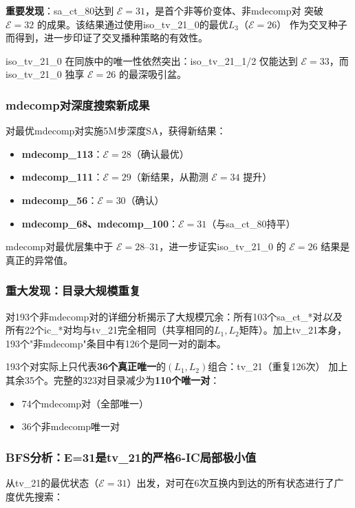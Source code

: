 \documentclass[11pt,a4paper]{ctexart}
\theoremstyle{remark}
\newcommand{\E}{\mathcal{E}}
\begin{document}
\textbf{重要发现}：sa\_ct\_80达到 $\E=31$，是首个非等价变体、非mdecomp对
突破 $\E=32$ 的成果。该结果通过使用iso\_tv\_21\_0的最优$L_3$（$\E=26$）
作为交叉种子而得到，进一步印证了交叉播种策略的有效性。

iso\_tv\_21\_0 在同族中的唯一性依然突出：iso\_tv\_21\_1/2 仅能达到
$\E=33$，而iso\_tv\_21\_0 独享 $\E=26$ 的最深吸引盆。

\subsubsection{mdecomp对深度搜索新成果}

对最优mdecomp对实施5M步深度SA，获得新结果：
\begin{itemize}[noitemsep]
  \item \textbf{mdecomp\_113}：$\E=28$（确认最优）
  \item \textbf{mdecomp\_111}：$\E=29$（新结果，从勘测 $\E=34$ 提升）
  \item \textbf{mdecomp\_56}：$\E=30$（确认）
  \item \textbf{mdecomp\_68、mdecomp\_100}：$\E=31$（与sa\_ct\_80持平）
\end{itemize}

mdecomp对最优层集中于 $\E=28$--$31$，进一步证实iso\_tv\_21\_0
的 $\E=26$ 结果是真正的异常值。

\subsubsection{重大发现：目录大规模重复}

对193个非mdecomp对的详细分析揭示了大规模冗余：所有103个sa\_ct\_*对\emph{以及}
所有22个ic\_*对均与tv\_21完全相同（共享相同的$L_1, L_2$矩阵）。加上tv\_21本身，
193个"非mdecomp"条目中有126个是同一对的副本。

193个对实际上只代表\textbf{36个真正唯一}的$(L_1, L_2)$组合：tv\_21（重复126次）
加上其余35个。完整的323对目录减少为\textbf{110个唯一对}：
\begin{itemize}[noitemsep]
  \item 74个mdecomp对（全部唯一）
  \item 36个非mdecomp唯一对
\end{itemize}

\subsubsection{BFS分析：E=31是tv\_21的严格6-IC局部极小值}

从tv\_21的最优状态（$\E=31$）出发，对可在6次互换内到达的所有状态进行了广度优先搜索：
\end{document}

